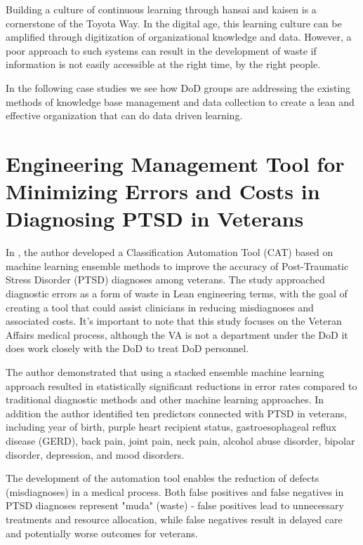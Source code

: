 \documentclass{article}
\begin{document}
		Building a culture of continuous learning through hansai and kaisen is a cornerstone of the Toyota Way.
		In the digital age, this learning culture can be amplified through digitization of organizational knowledge and data.
		However, a poor approach to such systems can result in the development of waste if information is not easily accessible at the right time, by the right people.

		In the following case studies we see how DoD groups are addressing the existing methods of knowledge base management and data collection to create a lean and effective organization that can do data driven learning.

		\section{Engineering Management Tool for Minimizing Errors and Costs in Diagnosing PTSD in Veterans \cite{Le2023}}

			In \cite{Le2023}, the author developed a Classification Automation Tool (CAT) based on machine learning ensemble methods to improve the accuracy of Post-Traumatic Stress Disorder (PTSD) diagnoses among veterans. 
			The study approached diagnostic errors as a form of waste in Lean engineering terms, with the goal of creating a tool that could assist clinicians in reducing misdiagnoses and associated costs.
			It's important to note that this study focuses on the Veteran Affairs medical process, although the VA is not a department under the DoD it does work closely with the DoD to treat DoD personnel.

			The author demonstrated that using a stacked ensemble machine learning approach resulted in statistically significant reductions in error rates compared to traditional diagnostic methods and other machine learning approaches. 
			In addition the author identified ten predictors connected with PTSD in veterans, including year of birth, purple heart recipient status, gastroesophageal reflux disease (GERD), back pain, joint pain, neck pain, alcohol abuse disorder, bipolar disorder, depression, and mood disorders. 

			The development of the automation tool enables the reduction of defects (misdiagnoses) in a medical process.
			Both false positives and false negatives in PTSD diagnoses represent "muda" (waste) - false positives lead to unnecessary treatments and resource allocation, while false negatives result in delayed care and potentially worse outcomes for veterans.
\end{document}

